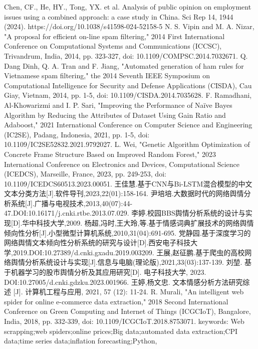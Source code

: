 \documentclass[UTF8,a4paper,15pt,titlepage,oneside]{ctexbook}
\begin{document}
\begin{thebibliography}{99}
     Chen, CF., He, HY., Tong, YX. et al. Analysis of public opinion on employment issues using a combined approach: a case study in China. Sci Rep 14, 1944 (2024). https://doi.org/10.1038/s41598-024-52158-5
     N. S. Vipin and M. A. Nizar, "A proposal for efficient on-line spam filtering," 2014 First International Conference on Computational Systems and Communications (ICCSC), Trivandrum, India, 2014, pp. 323-327, doi: 10.1109/COMPSC.2014.7032671.
     Q. Dang Dinh, Q. A. Tran and F. Jiang, "Automated generation of ham rules for Vietnamese spam filtering," the 2014 Seventh IEEE Symposium on Computational Intelligence for Security and Defense Applications (CISDA), Cau Giay, Vietnam, 2014, pp. 1-5, doi: 10.1109/CISDA.2014.7035628.
     F. Ramadhani, Al-Khowarizmi and I. P. Sari, "Improving the Performance of Naïve Bayes Algorithm by Reducing the Attributes of Dataset Using Gain Ratio and Adaboost," 2021 International Conference on Computer Science and Engineering (IC2SE), Padang, Indonesia, 2021, pp. 1-5, doi: 10.1109/IC2SE52832.2021.9792027.
     L. Wei, "Genetic Algorithm Optimization of Concrete Frame Structure Based on Improved Random Forest," 2023 International Conference on Electronics and Devices, Computational Science (ICEDCS), Marseille, France, 2023, pp. 249-253, doi: 10.1109/ICEDCS60513.2023.00051.
     王佳慧.基于CNN与Bi-LSTM混合模型的中文文本分类方法[J].软件导刊,2023,22(01):158-164.
     尹培培.大数据时代的网络舆情分析系统[J].广播与电视技术,2013,40(07):44-47.DOI:10.16171/j.cnki.rtbe.2013.07.029.
     李婷.校园BBS舆情分析系统的设计与实现[D].华中科技大学,2009.
     杨超,冯时,王大玲,等.基于情感词典扩展技术的网络舆情倾向性分析[J].小型微型计算机系统,2010,31(04):691-695.
     党静园.基于深度学习的网络舆情文本倾向性分析系统的研究与设计[D].西安电子科技大学,2019.DOI:10.27389/d.cnki.gxadu.2019.003209.
     王展,赵征鹏.基于爬虫的高校网络舆情分析系统设计与实现[J].信息与电脑(理论版),2021,33(03):137-139.
     刘堃. 基于机器学习的股市舆情分析及其应用研究[D]. 电子科技大学, 2023. DOI:10.27005/d.cnki.gdzku.2023.001966.
     王婷,杨文忠. 文本情感分析方法研究综述 [J]. 计算机工程与应用, 2021, 57 (12): 11-24.
     R. Murali, "An intelligent web spider for online e-commerce data extraction," 2018 Second International Conference on Green Computing and Internet of Things (ICGCIoT), Bangalore, India, 2018, pp. 332-339, doi: 10.1109/ICGCIoT.2018.8753071. keywords: {Web scrapping;web spiders;online prices;Big data;automated data extraction;CPI data;time series data;inflation forecasting;Python},


  \end{thebibliography}
\end{document}
